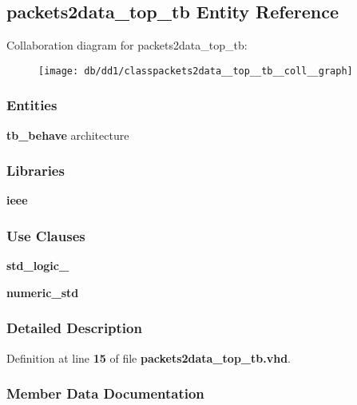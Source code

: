 \subsection{packets2data\+\_\+top\+\_\+tb Entity Reference}
\label{classpackets2data__top__tb}


Collaboration diagram for packets2data\+\_\+top\+\_\+tb\+:\nopagebreak
\begin{figure}[H]
\begin{center}
\leavevmode
\texttt{[image: db/dd1/classpackets2data\_\_top\_\_tb\_\_coll\_\_graph]}
\end{center}
\end{figure}
\subsubsection*{Entities}
\begin{DoxyCompactItemize}
\item 
{\bf tb\+\_\+behave} architecture
\end{DoxyCompactItemize}
\subsubsection*{Libraries}
 \begin{DoxyCompactItemize}
\item 
{\bf ieee} 
\end{DoxyCompactItemize}
\subsubsection*{Use Clauses}
 \begin{DoxyCompactItemize}
\item 
{\bf std\+\_\+logic\+\_}   
\item 
{\bf numeric\+\_\+std}   
\end{DoxyCompactItemize}


\subsubsection{Detailed Description}


Definition at line {\bf 15} of file {\bf packets2data\+\_\+top\+\_\+tb.\+vhd}.



\subsubsection{Member Data Documentation}
